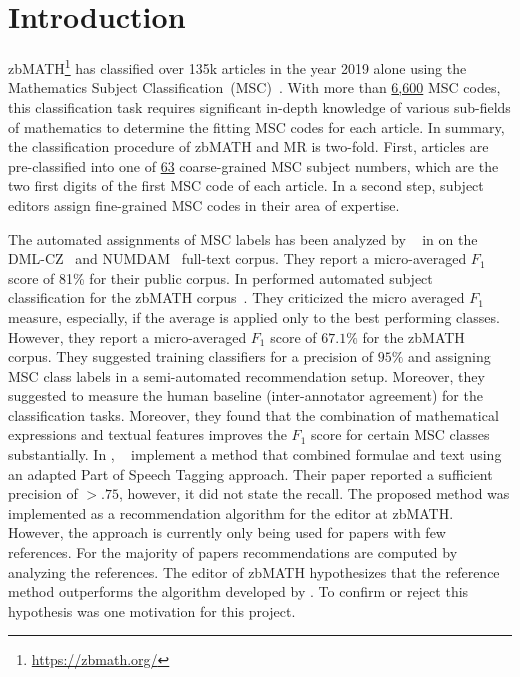 \section{Introduction}\label{sec:intro}
zbMATH\footnote{\href{https://zbmath.org/}{{https://zbmath.org/}}} has classified over 135k articles in the year 2019 alone using the Mathematics Subject Classification~(MSC)~\cite{Khnemund2016}.
With more than \href{https://zbmath.org/classification/}{{6,600}} MSC codes, this classification task requires significant in-depth knowledge of various sub-fields of mathematics to determine the fitting MSC codes for each article.
In summary, the classification procedure of zbMATH and MR is two-fold.
First, articles are pre-classified into one of \href{https://msc2020.org}{{63}} coarse-grained MSC subject numbers, which are the two first digits of the first MSC code of each article.
In a second step, subject editors assign fine-grained MSC codes in their area of expertise.


The automated assignments of MSC labels has been analyzed by \citeauthor{RehurekS08}~\cite{RehurekS08} in \citeyear{RehurekS08} on the DML-CZ~\cite{SojkaR07} and NUMDAM~\cite{BoucheL17} full-text corpus.
They report a micro-averaged $F_1$ score of 81\% for their public corpus.
In \citeyear{BarthelTB13} \citeauthor{BarthelTB13} performed automated subject classification for the zbMATH corpus~\cite{BarthelTB13}.
They criticized the micro averaged $F_1$ measure, especially, if the average is applied only to the best performing classes. However, they report a micro-averaged $F_1$ score of $67.1\%$ for the zbMATH corpus.
They suggested training classifiers for a precision of $95\%$ and assigning MSC class labels in a  semi-automated recommendation setup.
Moreover, they suggested to measure the human baseline (inter-annotator agreement) for the classification tasks.
Moreover, they found that the combination of mathematical expressions and textual features improves the $F_1$ score for certain MSC classes substantially.
In \citeyear{SchonebergS14}, \citeauthor{SchonebergS14}~\cite{SchonebergS14} implement a method that combined formulae and text using an adapted Part of Speech Tagging approach.
Their paper reported a sufficient precision of $>.75$, however, it did not state the recall.
The proposed method was implemented as a recommendation algorithm for the editor at zbMATH.
However, the approach is currently only being used for papers with few references.
For the majority of papers recommendations are computed by  analyzing the references.
The editor of zbMATH hypothesizes that the reference method outperforms the algorithm developed by \citeauthor{SchonebergS14}.
To confirm or reject this hypothesis was one motivation for this project.


